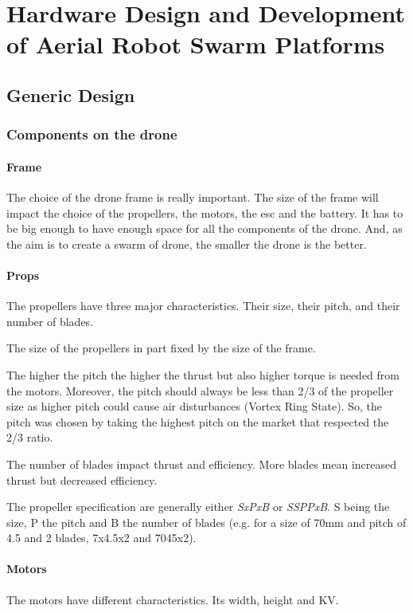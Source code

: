 \chapter{Hardware Design and Development of Aerial Robot Swarm Platforms}

\section{Generic Design}

\subsection{Components on the drone}

\subsubsection{Frame}
The choice of the drone frame is really important.
The size of the frame will impact the choice of the propellers, the motors, the \acrshort{esc} and the battery.
It has to be big enough to have enough space for all the components of the drone.
And, as the aim is to create a swarm of drone, the smaller the drone is the better.

\subsubsection{Props}
The propellers have three major characteristics. Their size, their pitch, and their number of blades.

The size of the propellers in part fixed by the size of the frame.

The higher the pitch the higher the thrust but also higher torque is needed from the motors.
Moreover, the pitch should always be less than 2/3 of the propeller size as higher pitch could cause air disturbances (Vortex Ring State).
So, the pitch was chosen by taking the highest pitch on the market that respected the 2/3 ratio.

The number of blades impact thrust and efficiency. More blades mean increased thrust but decreased efficiency.

The propeller specification are generally either \emph{SxPxB} or \emph{SSPPxB}.
S being the size, P the pitch and B the number of blades
(e.g. for a size of 70mm and pitch of 4.5 and 2 blades, 7x4.5x2 and 7045x2).

\subsubsection{Motors}
The motors have different characteristics. Its width, height and KV.

